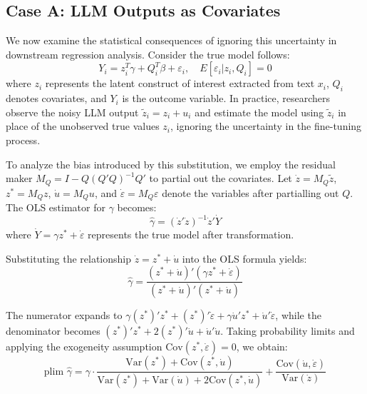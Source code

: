 \documentclass[11pt]{article}
\begin{document}
\subsection{Case A: LLM Outputs as Covariates}

We now examine the statistical consequences of ignoring this uncertainty in downstream regression analysis.
Consider the true model follows:
\begin{equation}
Y_i = z_i^T\gamma + Q_i^T\beta + \varepsilon_i, \quad E[\varepsilon_i|z_i, Q_i] = 0
\end{equation}
where $z_i$ represents the latent construct of interest extracted from text $x_i$, $Q_i$ denotes covariates, and $Y_i$ is the outcome variable.
In practice, researchers observe the noisy LLM output $\tilde{z}_i = z_i + u_i$ and
estimate the model using $\tilde{z}_i$ in place of the unobserved true values $z_i$, ignoring the uncertainty in the fine-tuning process.

To analyze the bias introduced by this substitution, we employ the residual maker $M_Q = I - Q(Q'Q)^{-1}Q'$ to partial out the covariates. 
Let $\dot{z} = M_Q\tilde{z}$, $z^* = M_Q z$, $\dot{u} = M_Q u$, and $\dot{\varepsilon} = M_Q \varepsilon$ denote the variables after partialling out $Q$. The OLS estimator for $\gamma$ becomes:
\begin{equation}
\hat{\gamma} = (\dot{z}'\dot{z})^{-1}\dot{z}'\dot{Y}
\end{equation}
where $\dot{Y} = \gamma z^* + \dot{\varepsilon}$ represents the true model after transformation.

Substituting the relationship $\dot{z} = z^* + \dot{u}$ into the OLS formula yields:
\begin{equation}
\hat{\gamma} = \frac{(z^* + \dot{u})'(\gamma z^* + \dot{\varepsilon})}{(z^* + \dot{u})'(z^* + \dot{u})}
\end{equation}

The numerator expands to $\gamma (z^*)' z^* + (z^*)' \dot{\varepsilon} + \gamma \dot{u}' z^* + \dot{u}' \dot{\varepsilon}$, while the denominator becomes $(z^*)' z^* + 2(z^*)' \dot{u} + \dot{u}' \dot{u}$. Taking probability limits and applying the exogeneity assumption $\text{Cov}(z^*, \dot{\varepsilon}) = 0$, we obtain:
\begin{equation}
\text{plim } \hat{\gamma} = \gamma \cdot \frac{\text{Var}(z^*) + \text{Cov}(z^*, \dot{u})}{\text{Var}(z^*) + \text{Var}(\dot{u}) + 2\text{Cov}(z^*, \dot{u})} + \frac{\text{Cov}(\dot{u}, \dot{\varepsilon})}{\text{Var}(\dot{z})} \tag{A1}
\end{equation}
\end{document}
